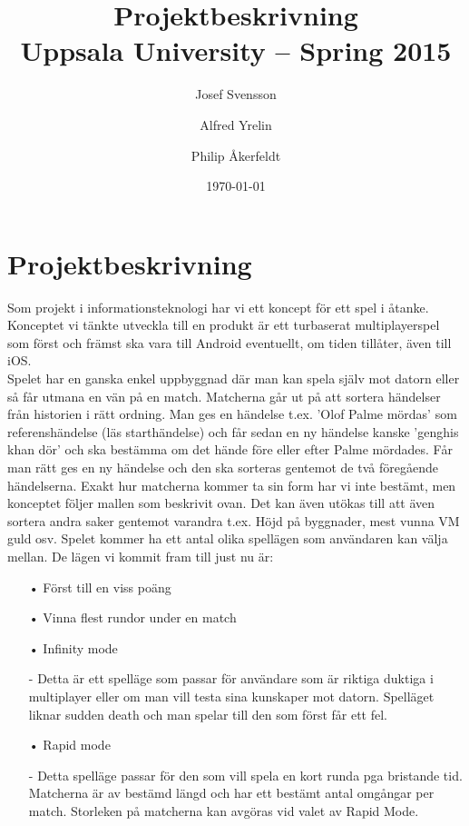 \documentclass[a4paper,11pt]{article}
\title{\textbf{Projektbeskrivning \\
    Uppsala University -- Spring 2015 \\
      }}
\author{
Josef Svensson\\
\and
Alfred Yrelin\\
\and
Philip \AA kerfeldt\\
}
\date{\today}
\begin{document}
\maketitle
\newpage
\section{Projektbeskrivning}
Som projekt i informationsteknologi har vi ett koncept för ett spel i åtanke. Konceptet vi tänkte utveckla till en produkt är ett turbaserat multiplayerspel som först och främst ska vara till Android eventuellt, om tiden tillåter, även till iOS.\\ Spelet har en ganska enkel uppbyggnad där man kan spela själv mot datorn eller så får utmana en vän på en match. Matcherna går ut på att sortera händelser från historien i rätt ordning. Man ges en händelse t.ex. 'Olof Palme mördas' som referenshändelse (läs starthändelse) och får sedan en ny händelse kanske 'genghis khan dör' och ska bestämma om det hände före eller efter Palme mördades. Får man rätt ges en ny händelse och den ska sorteras gentemot de två föregående händelserna. Exakt hur matcherna kommer ta sin form har vi inte bestämt, men konceptet följer mallen som beskrivit ovan. Det kan även utökas till att även sortera andra saker gentemot varandra t.ex. Höjd på byggnader, mest vunna VM guld osv.
Spelet kommer ha ett antal olika spellägen som användaren kan välja mellan. De lägen vi kommit fram till just nu är:
\begin{itemize}
\item[•] Först till en viss poäng
\item[•] Vinna flest rundor under en match
\item[•] Infinity mode
\item[-] Detta är ett spelläge som passar för användare som är riktiga duktiga i multiplayer eller om man vill testa sina kunskaper mot datorn. Spelläget liknar sudden death och man spelar till den som först får ett fel.
\item[•] Rapid mode
\item[-] Detta spelläge passar för den som vill spela en kort runda pga bristande tid. Matcherna är av bestämd längd och har ett bestämt antal omgångar per match. Storleken på matcherna kan avgöras vid valet av Rapid Mode. \\ 
\end{itemize}
\end{document}

